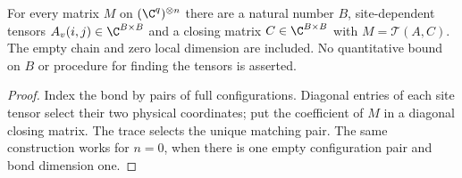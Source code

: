 \begin{lemma}
    \label{thm:finite_matrix_trace_chain}
    \leanok
    For every matrix $M$ on $(\C^q)^{\otimes n}$ there are a natural number
    $B$, site-dependent tensors $A_v(i,j)\in\C^{B\times B}$ and a closing
    matrix $C\in\C^{B\times B}$ with $M=\mathcal T(A,C)$.
    The empty chain and zero local dimension are included. No quantitative
    bound on $B$ or procedure for finding the tensors is asserted.
\end{lemma}
\begin{proof}
    \leanok
    Index the bond by pairs of full configurations. Diagonal entries of
    each site tensor select their two physical coordinates; put the
    coefficient of $M$ in a diagonal closing matrix. The trace selects the
    unique matching pair. The same construction works for $n=0$, when
    there is one empty configuration pair and bond dimension one.
\end{proof}
